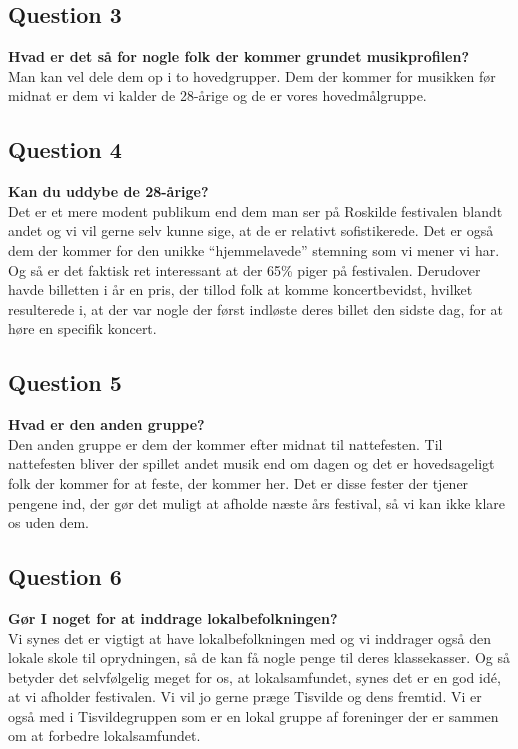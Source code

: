 \subsection{Question 3}
\noindent \textbf{Hvad er det så for nogle folk der kommer grundet musikprofilen?} \\
Man kan vel dele dem op i to hovedgrupper. Dem der kommer for musikken før midnat er dem vi kalder de 28-årige og de er vores hovedmålgruppe. 

\subsection{Question 4}
\noindent \textbf{Kan du uddybe de 28-årige?} \\
Det er et mere modent publikum end dem man ser på Roskilde festivalen blandt andet og vi vil gerne selv kunne sige, at de er relativt sofistikerede. Det er også dem der kommer for den unikke “hjemmelavede” stemning som vi mener vi har. Og så er det faktisk ret interessant at der 65\% piger på festivalen. Derudover havde billetten i år en pris, der tillod folk at komme koncertbevidst, hvilket resulterede i, at der var nogle der først indløste deres billet den sidste dag, for at høre en specifik koncert.

\subsection{Question 5}
\noindent \textbf{Hvad er den anden gruppe?} \\
Den anden gruppe er dem der kommer efter midnat til nattefesten. Til nattefesten bliver der spillet andet musik end om dagen og det er hovedsageligt folk der kommer for at feste, der kommer her. Det er disse fester der tjener pengene ind, der gør det muligt at afholde næste års festival, så vi kan ikke klare os uden dem. 

\subsection{Question 6}
\noindent \textbf{Gør I noget for at inddrage lokalbefolkningen?} \\
Vi synes det er vigtigt at have lokalbefolkningen med og vi inddrager også den lokale skole til oprydningen, så de kan få nogle penge til deres klassekasser. Og så betyder det selvfølgelig meget for os, at lokalsamfundet, synes det er en god idé, at vi afholder festivalen. Vi vil jo gerne præge Tisvilde og dens fremtid. Vi er også med i Tisvildegruppen som er en lokal gruppe af foreninger der er sammen om at forbedre lokalsamfundet.

